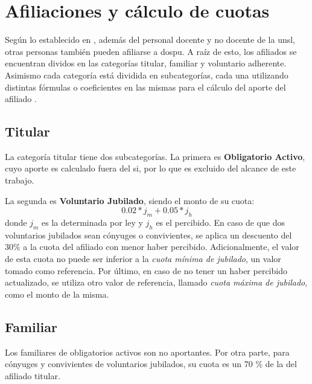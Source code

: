 \section{Afiliaciones y cálculo de cuotas}\label{sec:afiliaciones}

Según lo establecido en \cite{CSOrd53}, además del personal docente y no docente de la \acrshort{unsl}, otras personas también pueden afiliarse a \acrshort{dospu}.
%
A raíz de esto, los afiliados se encuentran dividos en las categorías titular, familiar y voluntario adherente. Asimismo cada categoría está dividida en subcategorías, cada una utilizando distintas fórmulas o coeficientes en las mismas para el cálculo del aporte del afiliado  \cite{dospuRes21}. 

\subsection{Titular} 
\label{sec:titular}

La categoría titular tiene dos subcategorías.
La primera es \textbf{Obligatorio Activo}, cuyo aporte es calculado fuera del \acrshort{si}, por lo que es excluido del alcance de este trabajo.


La segunda es \textbf{Voluntario Jubilado}, siendo el monto de su cuota: 
\begin{displaymath}
0.02 * j_m + 0.05 * j_h
\end{displaymath}
donde $j_m$ es la  determinada por ley y $j_h$ es el  percibido.
%
En caso de que dos voluntarios jubilados sean cónyuges o convivientes, se aplica un descuento del 30\% a la cuota del afiliado con menor haber percibido.
%
Adicionalmente, el valor de esta cuota no puede ser inferior a la \textit{cuota mínima de jubilado}, un valor tomado como referencia.
%
Por último, en caso de no tener un haber percibido actualizado, se utiliza otro valor de referencia, llamado \textit{cuota máxima de jubilado}, como el monto de la misma.

\subsection{Familiar} 
\label{sec:familiar}
Los familiares de obligatorios activos son no aportantes.
%
Por otra parte, para cónyuges y convivientes de voluntarios jubilados, su cuota es un 70 \% de la del afiliado titular.

